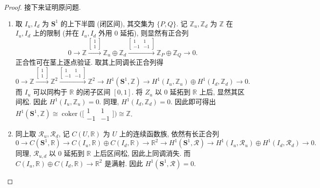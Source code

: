 \documentclass{article}
\theoremstyle{exercise}
\theoremstyle{theorem}
\theoremstyle{remark}
\def\Z{\mathbb{Z}}
\def\R{\mathbb{R}}
\def\bS{\mathbf{S}}
\def\cR{\mathscr{R}}
\def\coker{\operatorname{coker}}
\begin{document}
\begin{proof}
  接下来证明原问题.
  \begin{enumerate}[label=(\arabic*)]
    \item 取 $I_u, I_d$ 为 $\bS^1$ 的上下半圆 (闭区间), 其交集为 $\{P, Q\}$.
          记 $\Z_u, \Z_d$ 为 $\Z$ 在 $I_u, I_d$ 上的限制 (并在 $I_u, I_d$ 外用 $0$ 延拓), 则显然有正合列
          \[
          0 \to \Z \xrightarrow{\begin{bmatrix} 1 \\ 1 \end{bmatrix}} \Z_u \oplus \Z_d \xrightarrow{\begin{bmatrix} 1 & 1 \\ -1 & -1 \end{bmatrix}} \Z_P \oplus \Z_Q \to 0.
          \]
          正合性可在茎上逐点验证. 取其上同调长正合列得
          \[
          0 \to \Z \xrightarrow{\begin{bmatrix} 1 \\ 1 \end{bmatrix}} \Z^2 \xrightarrow{\begin{bmatrix} 1 & 1 \\ -1 & -1 \end{bmatrix}} \Z^2
          \to H^1(\bS^1, \Z) \to H^1(I_u, \Z_u) \oplus H^1(I_d, \Z_d) \to 0.
          \]
          而 $I_u$ 可以同构于 $\R$ 的闭子区间 $[0, 1]$. 将 $Z_u$ 以 $0$ 延拓到 $\R$ 上后, 显然其区间松. 因此 $H^1(I_u, \Z_u) = 0$.
          同理, $H^1(I_d, \Z_d) = 0$. 因此即可得出 $H^1(\bS^1, \Z) \cong \coker\bigl(\bigl[\begin{smallmatrix} 1 & 1 \\ -1 & -1 \end{smallmatrix}\bigr]\bigr) \cong \Z$.
    \item 同上取 $\cR_u, \cR_d$, 记 $C(U, \R)$ 为 $U$ 上的连续函数族, 依然有长正合列
          \[
          0 \to C(\bS^1, \R) \to C(I_u, \R) \oplus C(I_d, \R) \to \R^2
          \to H^1(\bS^1, \cR) \to H^1(I_u, \cR_u) \oplus H^1(I_d, \cR_d) \to 0.
          \]
          同理, $\cR_{u, d}$ 以 $0$ 延拓到 $\R$ 上后区间松, 因此上同调消失. 而 $C(I_u, \R) \oplus C(I_d, \R) \to \R^2$ 是满射.
          因此 $H^1(\bS^1, \cR) = 0$. \qedhere
  \end{enumerate}
\end{proof}
\end{document}
